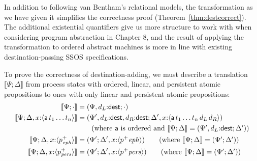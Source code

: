 In addition to following van Bentham's relational models, the
transformation as we have given it simplifies the correctness
proof (Theorem~\ref{thm:destcorrect}). The additional existential
quantifiers give us more structure to work with when considering
program abstraction in Chapter 8, and the result of applying the
transformation to ordered abstract machines is more in line with 
existing destination-passing SSOS specifications.



To prove the correctness of destination-adding, we must describe a 
translation $\llbracket \Psi; \Delta \rrbracket$ from process states
with ordered, linear, and persistent atomic propositions to ones
with only linear and persistent atomic propositions:
\begin{align*}
\llbracket \Psi; \cdot \rrbracket & = (\Psi, d_L{:}{\sf dest}; \cdot) 
\\
\llbracket \Psi; \Delta, x{:}\langle {{\sf a}\,t_1\ldots t_n} \rangle \rrbracket 
& = (\Psi', d_L{:}{\sf dest}, d_R{:}{\sf dest}; 
     \Delta', x{:}\langle {{\sf a}\,t_1\ldots t_n\,d_L\,d_R} \rangle)\\
& \qquad
  \mbox{(where $\sf a$ is ordered and
  $\llbracket \Psi; \Delta \rrbracket = (\Psi', d_L{:}{\sf dest}; \Delta') $)}
\\
\llbracket \Psi; \Delta, x{:}\langle {p^+_{\it eph}} \rangle \rrbracket 
& = (\Psi'; \Delta', x{:}\langle {p^+{\it eph}} \rangle)
 \qquad \mbox{(where
       $\llbracket \Psi; \Delta \rrbracket = (\Psi'; \Delta') $)}
\\
\llbracket \Psi; \Delta, x{:}\langle {p^+_{\it pers}} \rangle \rrbracket 
& = (\Psi'; \Delta', x{:}\langle {p^+{\it pers}} \rangle)
  \qquad \mbox{(where 
       $\llbracket \Psi; \Delta \rrbracket = (\Psi'; \Delta') $)}
\end{align*}

